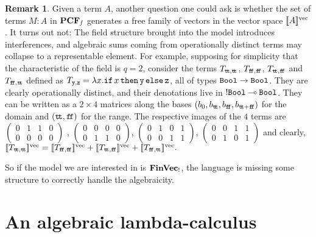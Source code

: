 \documentclass[10pt]{article}
\theoremstyle{plain}
\theoremstyle{definition}
\newtheorem{remark}[theorem]{Remark}
\newcommand{\loli}{\mathbin{\multimap}}
\newcommand{\FinVec}{\mbox{\bf FinVec}}
\newcommand{\ttrue}{{\tt t}\!{\tt t}}
\newcommand{\ffalse}{{\tt f}\!{\tt f}}
\newcommand{\ifterm}[3]{{{\tt if}\,{#1}\,{\tt then}\,{#2}\,{\tt else}\,{#3}}}
\newcommand{\bit}{{\tt Bool}}
\newcommand{\fvdenot}[1]{{[\![{#1}]\!]^{\rm vec}}}
\begin{document}
\begin{remark}
Given a term $A$, another question one could ask is whether the set of
terms $M:A$ in ${\bf PCF}_{\it f}$ generates a free family of vectors in the
vector space $\fvdenot{A}$. It turns
out not: The field structure brought into the model introduces
interferences, and algebraic sums coming from operationally distinct
terms may collapse to a representable element. For example, supposing
for simplicity that the characteristic of the field is $q=2$, consider
the terms $T_{\ttrue,\ttrue}$, $T_{\ffalse,\ffalse}$,
$T_{\ttrue,\ffalse}$ and $T_{\ffalse,\ttrue}$ defined as $T_{{\tt
    y},{\tt z}} = \lambda x.\ifterm{x}{\tt y}{\tt z}$,
all of types $\bit\to\bit$. They are clearly operationally distinct,
and their denotations live in ${!\bit}\loli\bit$. They can be
written as a $2\times 4$ matrices along the bases
$(b_{0},b_{\ttrue},b_{\ffalse},b_{\ttrue+\ffalse})$ for the domain and
$(\ttrue,\ffalse)$ for the range. The respective images of the $4$
terms are
$\left(\begin{smallmatrix}
0&1&1&0\\
0&0&0&0
\end{smallmatrix}\right)$
,
$\left(\begin{smallmatrix}
0&0&0&0\\
0&1&1&0
\end{smallmatrix}\right)$,
$\left(\begin{smallmatrix}
0&1&0&1\\
0&0&1&1
\end{smallmatrix}\right)$,
$\left(\begin{smallmatrix}
0&0&1&1\\
0&1&0&1
\end{smallmatrix}\right)$
and clearly,
$
\fvdenot{T_{\ttrue,\ttrue}}
=
\fvdenot{T_{\ffalse,\ffalse}}
+
\fvdenot{T_{\ttrue,\ffalse}}
+
\fvdenot{T_{\ffalse,\ttrue}}.
$

So if the model we are interested in is ${\FinVec_!}$, the language is
missing some structure to correctly handle the algebraicity.
\end{remark}


\section{An algebraic lambda-calculus}
\label{sec:alglc}
\end{document}
